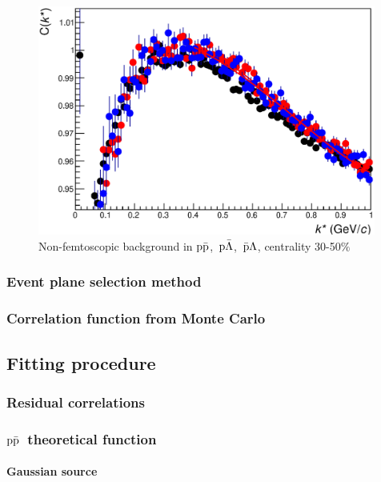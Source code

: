 \documentclass[ALICE,manyauthors]{ALICE_analysis_notes}
\newcommand{\pap}{$\rm p\bar{\rm p}$}
\newcommand{\pal}{$\rm p\bar{\rm \Lambda}$}
\newcommand{\apl}{$\bar{\rm p }\Lambda$}
\begin{document}
\begin{figure}[]
   \centering
   \includegraphics[width=0.99\textwidth]{pics/compBack3050}
   \caption{ Non-femtoscopic background in \pap,~\pal,~\apl, centrality 30-50$\%$}
   \label{fig:backCorrFun3050}
 \end{figure}

\subsubsection{Event plane selection method}

\subsubsection{Correlation function from Monte Carlo}

\subsection{Fitting procedure}

\subsubsection{Residual correlations}

\subsubsection{\pap~theoretical function}

\paragraph{Gaussian source}
\end{document}
